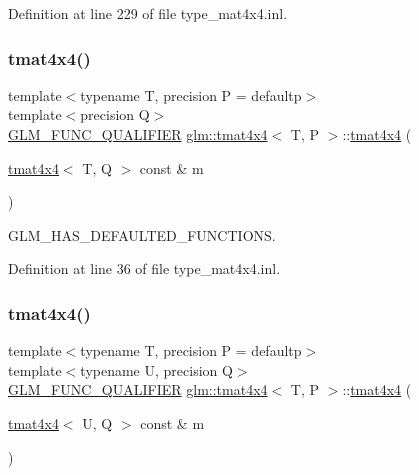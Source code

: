 Definition at line 229 of file type\+\_\+mat4x4.\+inl.

\mbox{\label{structglm_1_1tmat4x4_a38fede3f5f8ca53ebc215435945572da}} 
\subsubsection{\texorpdfstring{tmat4x4()}{tmat4x4()}\hspace{0.1cm}{\footnotesize\ttfamily [19/22]}}
{\footnotesize\ttfamily template$<$typename T, precision P = defaultp$>$ \\
template$<$precision Q$>$ \\
\mbox{\hyperlink{setup_8hpp_a33fdea6f91c5f834105f7415e2a64407}{G\+L\+M\+\_\+\+F\+U\+N\+C\+\_\+\+Q\+U\+A\+L\+I\+F\+I\+ER}} \mbox{\hyperlink{structglm_1_1tmat4x4}{glm\+::tmat4x4}}$<$ T, P $>$\+::\mbox{\hyperlink{structglm_1_1tmat4x4}{tmat4x4}} (\begin{DoxyParamCaption}\item[{\mbox{\hyperlink{structglm_1_1tmat4x4}{tmat4x4}}$<$ T, Q $>$ const \&}]{m }\end{DoxyParamCaption})}



G\+L\+M\+\_\+\+H\+A\+S\+\_\+\+D\+E\+F\+A\+U\+L\+T\+E\+D\+\_\+\+F\+U\+N\+C\+T\+I\+O\+NS. 



Definition at line 36 of file type\+\_\+mat4x4.\+inl.

\mbox{\label{structglm_1_1tmat4x4_a58ef8d393212acb0d9a3809d1fd05fe4}} 
\subsubsection{\texorpdfstring{tmat4x4()}{tmat4x4()}\hspace{0.1cm}{\footnotesize\ttfamily [20/22]}}
{\footnotesize\ttfamily template$<$typename T, precision P = defaultp$>$ \\
template$<$typename U, precision Q$>$ \\
\mbox{\hyperlink{setup_8hpp_a33fdea6f91c5f834105f7415e2a64407}{G\+L\+M\+\_\+\+F\+U\+N\+C\+\_\+\+Q\+U\+A\+L\+I\+F\+I\+ER}} \mbox{\hyperlink{structglm_1_1tmat4x4}{glm\+::tmat4x4}}$<$ T, P $>$\+::\mbox{\hyperlink{structglm_1_1tmat4x4}{tmat4x4}} (\begin{DoxyParamCaption}\item[{\mbox{\hyperlink{structglm_1_1tmat4x4}{tmat4x4}}$<$ U, Q $>$ const \&}]{m }\end{DoxyParamCaption})}



